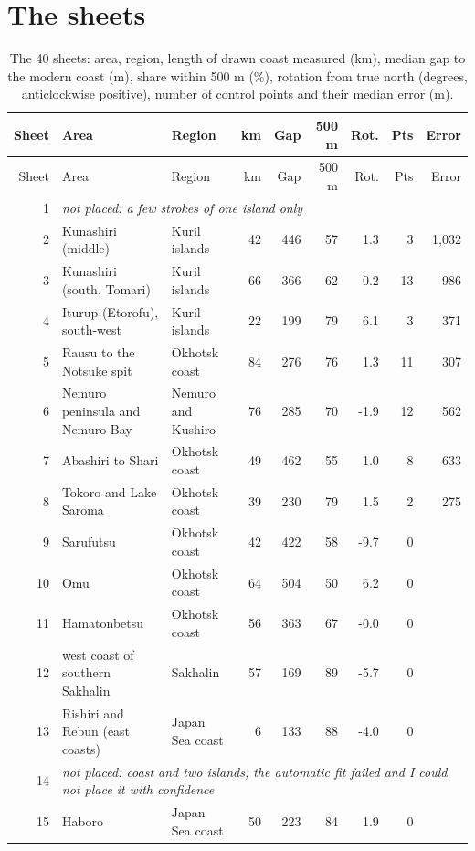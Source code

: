 \documentclass[11pt,a4paper]{article}
\begin{document}
\section{The sheets}
{\footnotesize\setlength{\tabcolsep}{4pt}\begin{longtable}{rp{4.2cm}p{2.6cm}rrrrrr}\caption{The 40 sheets: area, region, length of drawn coast measured (km), median gap to the modern coast (m), share within 500 m (\%), rotation from true north (degrees, anticlockwise positive), number of control points and their median error (m).}\label{tab:sheets}\\\toprule Sheet & Area & Region & km & Gap & 500 m & Rot. & Pts & Error\\\midrule\endfirsthead\toprule Sheet & Area & Region & km & Gap & 500 m & Rot. & Pts & Error\\\midrule\endhead
1 & \multicolumn{8}{l}{\textit{not placed: a few strokes of one island only}}\\
2 & Kunashiri (middle) & Kuril islands & 42 & 446 & 57 & 1.3 & 3 & 1,032\\
3 & Kunashiri (south, Tomari) & Kuril islands & 66 & 366 & 62 & 0.2 & 13 & 986\\
4 & Iturup (Etorofu), south-west & Kuril islands & 22 & 199 & 79 & 6.1 & 3 & 371\\
5 & Rausu to the Notsuke spit & Okhotsk coast & 84 & 276 & 76 & 1.3 & 11 & 307\\
6 & Nemuro peninsula and Nemuro Bay & Nemuro and Kushiro & 76 & 285 & 70 & -1.9 & 12 & 562\\
7 & Abashiri to Shari & Okhotsk coast & 49 & 462 & 55 & 1.0 & 8 & 633\\
8 & Tokoro and Lake Saroma & Okhotsk coast & 39 & 230 & 79 & 1.5 & 2 & 275\\
9 & Sarufutsu & Okhotsk coast & 42 & 422 & 58 & -9.7 & 0 & \\
10 & Omu & Okhotsk coast & 64 & 504 & 50 & 6.2 & 0 & \\
11 & Hamatonbetsu & Okhotsk coast & 56 & 363 & 67 & -0.0 & 0 & \\
12 & west coast of southern Sakhalin & Sakhalin & 57 & 169 & 89 & -5.7 & 0 & \\
13 & Rishiri and Rebun (east coasts) & Japan Sea coast & 6 & 133 & 88 & -4.0 & 0 & \\
14 & \multicolumn{8}{l}{\textit{not placed: coast and two islands; the automatic fit failed and I could not place it with confidence}}\\
15 & Haboro & Japan Sea coast & 50 & 223 & 84 & 1.9 & 0 & \\

\end{longtable}}
\end{document}
